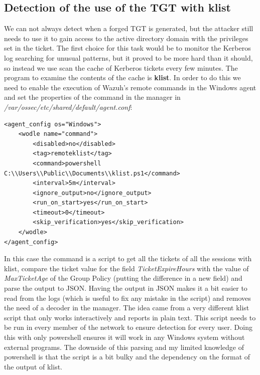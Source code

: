 \subsection{Detection of the use of the TGT with klist}
We can not always detect when a forged TGT is generated, but the attacker still needs to use it to gain access to the active directory domain with the privileges set in the ticket. The first choice for this task would be to monitor the Kerberos log searching for unusual patterns, but it proved to be more hard than it should, so instead we use scan the cache of Kerberos tickets every few minutes.
\linej
The program to examine the contents of the cache is \textbf{klist}.
\linej
\linej
In order to do this we need to enable the execution of Wazuh's remote commands in the Windows agent and set the properties of the command in the manager in \textit{/var/ossec/etc/shared/default/agent.conf}\cite{wazuh_remote_command}:
\linej
\begin{lstlisting}[style=xml]
<agent_config os="Windows">
	<wodle name="command">
		<disabled>no</disabled>
		<tag>remoteklist</tag>
		<command>powershell C:\\Users\\Public\\Documents\\klist.ps1</command>
		<interval>5m</interval>
		<ignore_output>no</ignore_output>
		<run_on_start>yes</run_on_start>
		<timeout>0</timeout>
		<skip_verification>yes</skip_verification>
	</wodle>
</agent_config>
\end{lstlisting}
\linej
In this case the command is a script to get all the tickets of all the sessions with klist, compare the ticket value for the field \textit{TicketExpireHours} with the value of \textit{MaxTicketAge} of the Group Policy (putting the difference in a new field) and parse the output to JSON. Having the output in JSON makes it a bit easier to read from the logs (which is useful to fix any mistake in the script) and removes the need of a decoder in the manager.
The idea came from a very different klist script that only works interactively and reports in plain text\cite{klist_script_idea}.
\linej
This script needs to be run in every member of the network to ensure detection for every user.
\linej
Doing this with only powershell ensures it will work in any Windows system without external programs. The downside of this parsing and my limited knowledge of powershell is that the script is a bit bulky and the dependency on the format of the output of klist.
\linej

